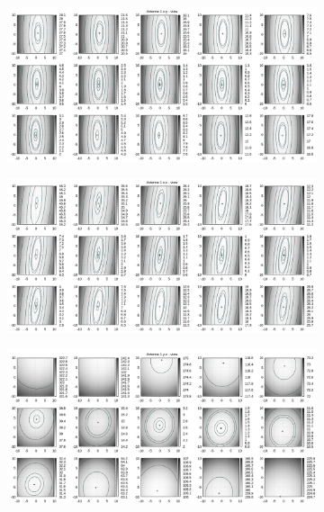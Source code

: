 \begin{appendix}
\begin{figure}[!ht]
\begin{subfigure}[t]{0.3\textwidth}
	\end{subfigure}
\\
	\centering
	\begin{subfigure}[t]{0.3\textwidth}
	     \centering
	     \includegraphics[width=\textwidth]{img/fitness/xy/a1.png}
	\end{subfigure}
	\begin{subfigure}[t]{0.3\textwidth}
		\centering
	     \includegraphics[width=\textwidth]{img/fitness/xz/a1.png}
	\end{subfigure}
	\begin{subfigure}[t]{0.3\textwidth}
			\centering
	   \includegraphics[width=\textwidth]{img/fitness/yz/a1.png}

\end{subfigure}
\end{figure}
\end{appendix}

